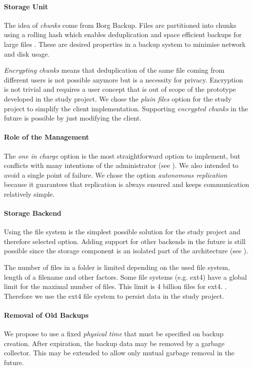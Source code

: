 \paragraph{Storage Unit}
The idea of \emph{chunks} come from Borg Backup. Files are partitioned into chunks using a rolling hash which enables deduplication and space efficient backups for large files \cite{borg-data-structures}. These are desired properties in a backup system to minimise network and disk usage.

\emph{Encrypting chunks} means that deduplication of the same file coming from different users is not possible anymore but is a necessity for privacy. Encryption is not trivial and requires a user concept that is out of scope of the prototype developed in the study project.
We chose the \emph{plain files} option for the study project to simplify the \gls{client} implementation. Supporting \emph{encrypted chunks} in the future is possible by just modifying the \gls{client}.

\paragraph{Role of the Management}
The \emph{one in charge} option is the most straightforward option to implement, but conflicts with many intentions of the administrator (see ). We also intended to avoid a single point of failure. We chose the option \emph{autonomous replication} because it guarantees that replication is always ensured and keeps communication relatively simple.

\paragraph{Storage Backend}
Using the file system is the simplest possible solution for the study project and therefore selected option. Adding support for other backends in the future is still possible since the storage component is an isolated part of the architecture (see ).

The number of files in a folder is limited depending on the used file system, length of a filename and other factors. Some file systems (e.g. ext4) have a global limit for the maximal number of files. This limit is 4 billion files for ext4. \cite{ext4}. Therefore we use the ext4 file system to persist data in the study project.

\paragraph{Removal of Old Backups}\label{sec:removal-of-old-backups}
We propose to use a fixed \emph{physical time} that must be specified on backup creation. After expiration, the backup data may be removed by a garbage collector. This may be extended to allow only mutual garbage removal in the future.

